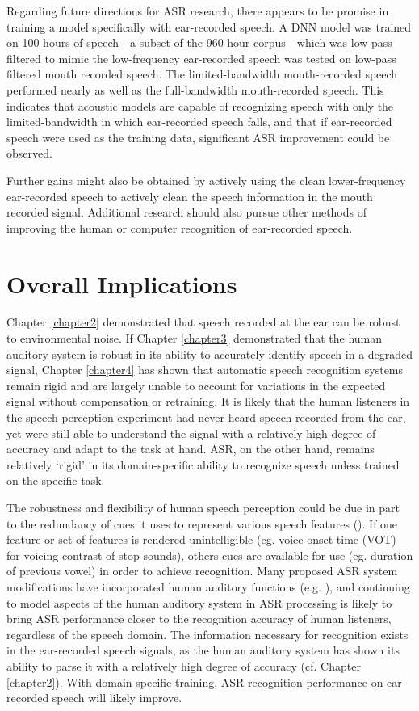 Regarding future directions for ASR research, there appears to be promise in training a model specifically with ear-recorded speech. A DNN model was trained on 100 hours of speech - a subset of the 960-hour corpus - which was low-pass filtered to mimic the low-frequency ear-recorded speech was tested on low-pass filtered mouth recorded speech.  The limited-bandwidth mouth-recorded speech performed nearly as well as the full-bandwidth mouth-recorded speech.  This indicates that acoustic models are capable of recognizing speech with only the limited-bandwidth in which ear-recorded speech falls, and that if ear-recorded speech were used as the training data, significant ASR improvement could be observed.

Further gains might also be obtained by actively using the clean lower-frequency ear-recorded speech to actively clean the speech information in the mouth recorded signal.   
Additional research should also pursue other methods of improving the human or computer recognition of ear-recorded speech. 


\section{Overall Implications}

Chapter \ref{chapter2} demonstrated that speech recorded at the ear can be robust to environmental noise.  If Chapter \ref{chapter3} demonstrated that the human auditory system is robust in its ability to accurately identify speech in a degraded signal, Chapter \ref{chapter4} has shown that automatic speech recognition systems remain rigid and are largely unable to account for variations in the expected signal without compensation or retraining.  It is likely that the human listeners in the speech perception experiment had never heard speech recorded from the ear, yet were still able to understand the signal with a relatively high degree of accuracy and adapt to the task at hand.  ASR, on the other hand, remains relatively `rigid' in its domain-specific ability to recognize speech unless trained on the specific task.

The robustness and flexibility of human speech perception could be due in part to the redundancy of cues it uses to represent various speech features (\cite{winter:14}).  If one feature or set of features is rendered unintelligible (eg. voice onset time (VOT) for voicing contrast of stop sounds), others cues are available for use (eg. duration of previous vowel) in order to achieve recognition.  Many proposed ASR system modifications have incorporated human auditory functions (e.g. \cite{kim:99,fazel:12,moritz:15}), and continuing to model aspects of the human auditory system in ASR processing is likely to bring ASR performance closer to the recognition accuracy of human listeners, regardless of the speech domain.  The information necessary for recognition exists in the ear-recorded speech signals, as the human auditory system has shown its ability to parse it with a relatively high degree of accuracy (cf. Chapter \ref{chapter2}).  With domain specific training, ASR recognition performance on ear-recorded speech will likely improve.

